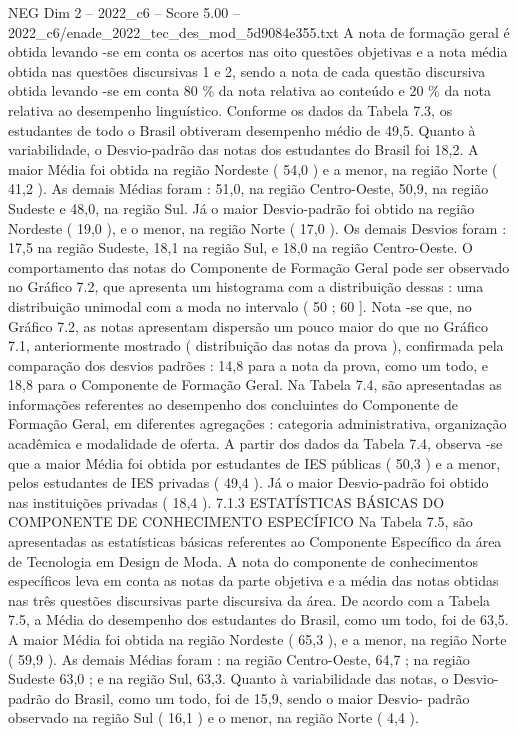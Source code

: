 \begin{textsample}{NEG Dim 2 – 2022\_c6 – Score 5.00 – 2022\_c6/enade\_2022\_tec\_des\_mod\_5d9084e355.txt}
A nota de formação geral é obtida levando -se em conta os acertos nas oito questões objetivas e a nota média obtida nas questões discursivas 1 e 2, sendo a nota de cada questão discursiva obtida levando -se em conta 80 \% da nota relativa ao conteúdo e 20 \% da nota relativa ao desempenho linguístico.
Conforme os dados da Tabela 7.3, os estudantes de todo o Brasil obtiveram desempenho médio de 49,5.
Quanto à variabilidade, o Desvio-padrão das notas dos estudantes do Brasil foi 18,2.
A maior Média foi obtida na região Nordeste ( 54,0 ) e a menor, na região Norte ( 41,2 ).
As demais Médias foram : 51,0, na região Centro-Oeste, 50,9, na região Sudeste e 48,0, na região Sul.
Já o maior Desvio-padrão foi obtido na região Nordeste ( 19,0 ), e o menor, na região Norte ( 17,0 ).
Os demais Desvios foram : 17,5 na região Sudeste, 18,1 na região Sul, e 18,0 na região Centro-Oeste.
O comportamento das notas do Componente de Formação Geral pode ser observado no Gráfico 7.2, que apresenta um histograma com a distribuição dessas : uma distribuição unimodal com a moda no intervalo ( 50 ; 60 ].
Nota -se que, no Gráfico 7.2, as notas apresentam dispersão um pouco maior do que no Gráfico 7.1, anteriormente mostrado ( distribuição das notas da prova ), confirmada pela comparação dos desvios padrões : 14,8 para a nota da prova, como um todo, e 18,8 para o Componente de Formação Geral.
Na Tabela 7.4, são apresentadas as informações referentes ao desempenho dos concluintes do Componente de Formação Geral, em diferentes agregações : categoria administrativa, organização acadêmica e modalidade de oferta.
A partir dos dados da Tabela 7.4, observa -se que a maior Média foi obtida por estudantes de IES públicas ( 50,3 ) e a menor, pelos estudantes de IES privadas ( 49,4 ).
Já o maior Desvio-padrão foi obtido nas instituições privadas ( 18,4 ). 7.1.3 ESTATÍSTICAS BÁSICAS DO COMPONENTE DE CONHECIMENTO ESPECÍFICO Na Tabela 7.5, são apresentadas as estatísticas básicas referentes ao Componente Específico da área de Tecnologia em Design de Moda.
A nota do componente de conhecimentos específicos leva em conta as notas da parte objetiva e a média das notas obtidas nas três questões discursivas parte discursiva da área.
De acordo com a Tabela 7.5, a Média do desempenho dos estudantes do Brasil, como um todo, foi de 63,5.
A maior Média foi obtida na região Nordeste ( 65,3 ), e a menor, na região Norte ( 59,9 ).
As demais Médias foram : na região Centro-Oeste, 64,7 ; na região Sudeste 63,0 ; e na região Sul, 63,3.
Quanto à variabilidade das notas, o Desvio-padrão do Brasil, como um todo, foi de 15,9, sendo o maior Desvio- padrão observado na região Sul ( 16,1 ) e o menor, na região Norte ( 4,4 ).

\end{textsample}
